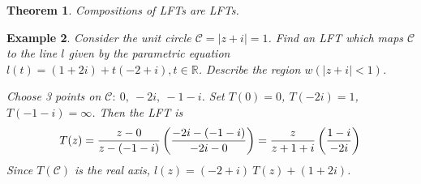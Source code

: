 \documentclass{article}
\newtheorem{theorem}{Theorem}[section]
\newtheorem{example}[theorem]{Example}
\theoremstyle{definition}
\begin{document}
\begin{theorem} \normalfont
    Compositions of LFTs are LFTs.
\end{theorem}

\begin{example} \normalfont
    Consider the unit circle $\mathcal{C} = |z+i| = 1$. Find an LFT which maps $\mathcal{C}$ to the line $l$ given by the parametric equation $l(t) = (1 + 2i) + t(-2 + i), t \in \mathbb{R}$. Describe the region $w(|z+i| < 1)$. \vspace{1em}

    \begin{minipage}{0.65\textwidth}
        Choose 3 points on $\mathcal{C}:\ 0,\ -2i,\ -1-i$. Set $T(0) = 0$, $T(-2i) = 1$, $T(-1 - i) = \infty$. Then the LFT is
        \begin{equation*}
            T(z) = \frac{z-0}{z - (-1-i)} \left( \frac{-2i - (-1 - i)}{-2i - 0} \right) = \frac{z}{z + 1 + i} \left( \frac{1-i}{-2i} \right) \\
        \end{equation*}
        Since $T(\mathcal{C})$ is the real axis, $l(z) = (-2+i)\ T(z) + (1+2i)$.
    \end{minipage}
    \hfill
    \begin{minipage}{0.3\textwidth}
\end{minipage}
\end{example}
\end{document}
